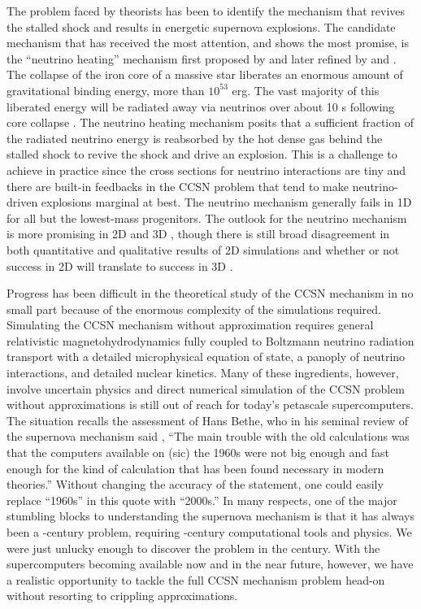 The problem faced by theorists has been to identify the mechanism that revives the stalled shock and results in energetic supernova explosions.
The candidate mechanism that has received the most attention, and shows the most promise, is the ``neutrino heating'' mechanism first proposed by \citet{Colgate:1966} and later refined by \citet{Bethe:1985} and \citet{Bruenn:1985}.
The collapse of the iron core of a massive star liberates an enormous amount of gravitational binding energy, more than $10^{53}$ erg.
The vast majority of this liberated energy will be radiated away via neutrinos over about 10 s following core collapse \citep{Burrows:1986}.
The neutrino heating mechanism posits that a sufficient fraction of the radiated neutrino energy is reabsorbed by the hot dense gas behind the stalled shock to revive the shock and drive an explosion.
This is a challenge to achieve in practice since the cross sections for neutrino interactions are tiny and there are built-in feedbacks in the CCSN problem that tend to make neutrino-driven explosions marginal at best.
The neutrino mechanism generally fails in 1D for all but the lowest-mass progenitors.
The outlook for the neutrino mechanism is more promising in 2D \citep{Muller:2012a, Bruenn:2013, Bruenn:2014} and 3D \citep{Melson:2015, Melson:2015a, Lentz:2015}, though there is still broad disagreement in both quantitative and qualitative results of 2D simulations \citep[see, e.g.,][]{Dolence:2015} and whether or not success in 2D will translate to success in 3D \citep{Couch:2013a, Tamborra:2014, Couch:2014}.

Progress has been difficult in the theoretical study of the CCSN mechanism in no small part because of the enormous complexity of the simulations required.
Simulating the CCSN mechanism without approximation requires general relativistic magnetohydrodynamics fully coupled to Boltzmann neutrino radiation transport with a detailed microphysical equation of state, a panoply of neutrino interactions, and detailed nuclear kinetics.
Many of these ingredients, however, involve uncertain physics and direct numerical simulation of the CCSN problem without approximations is still out of reach for today's petascale supercomputers.
The situation recalls the assessment of Hans Bethe, who in his seminal review of the supernova mechanism said \citep{Bethe:1990}, ``The main trouble with the old calculations was that the computers available on (sic) the 1960s were not big enough and fast enough for the kind of calculation that has been found necessary in modern theories.''
Without changing the accuracy of the statement, one could easily replace ``1960s'' in this quote with ``2000s.''
In many respects, one of the major stumbling blocks to understanding the supernova mechanism is that it has always been a -century problem, requiring -century computational tools and physics.
We were just unlucky enough to discover the problem in the  century.
With the supercomputers becoming available now and in the near future, however, we have a realistic opportunity to tackle the full CCSN mechanism problem head-on without resorting to crippling approximations.

